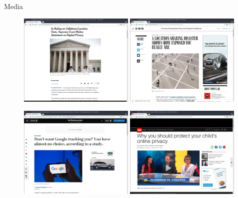 \documentclass[10pt]{beamer}
\begin{document}
	\begin{frame}{Media}
		\begin{figure}
			\includegraphics[width=0.49\textwidth]{figures/news1.png}
			\includegraphics[width=0.49\textwidth]{figures/news2.png}
			
			\includegraphics[width=0.49\textwidth]{figures/news3.png}
			\includegraphics[width=0.49\textwidth]{figures/news4.png}
		\end{figure}
	\end{frame}
\end{document}
